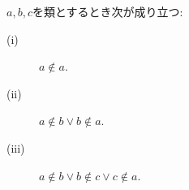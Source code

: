 	
	\begin{screen}
		\begin{thm}[いかなる類も自分自身を要素に持たない]
		\label{thm:no_set_is_an_element_of_itself}
			$a,b,c$を類とするとき次が成り立つ:
			\begin{description}
				\item[(i)] $a \notin a$.
				
				\item[(ii)] $a \notin b \vee b \notin a$.
				
				\item[(iii)] $a \notin b \vee b \notin c \vee c \notin a$.
			\end{description}
		\end{thm}
	\end{screen}
	
